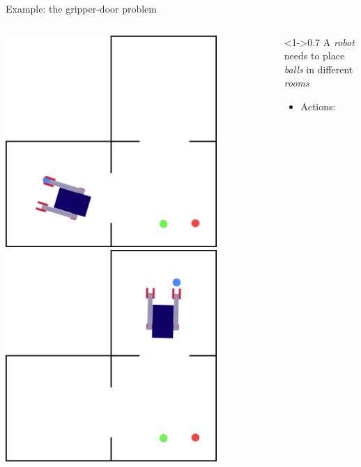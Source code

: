 \begin{frame}[fragile]{Example: the gripper-door problem}
\begin{columns}[c]
\begin{column}{0.3\textwidth}
\begin{overprint}
                \includegraphics[width = 0.8\textwidth]{images/3_rooms/gd_3_3.png}
                \includegraphics[width = 0.8\textwidth]{images/3_rooms/gd_3_6.png}
            \end{overprint}
        \end{column}
        \begin{column}<1->{0.7\textwidth}
            A \textit{robot} needs to place \textit{balls} in different \textit{rooms}
            \small
            \begin{itemize}
                \item Actions:

\end{itemize}
\end{column}
\end{columns}
\end{frame}
